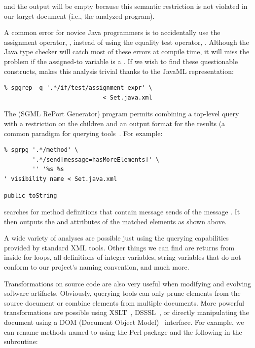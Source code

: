 \documentclass{article}
\begin{document}
\noindent and the output will be empty because this semantic restriction is not
violated in our target document (i.e., the analyzed program).

A common error for novice Java programmers is to accidentally use the
assignment operator, \smtexttt{=}, instead of using the equality test
operator, \smtexttt{==}.  Although the Java type checker will catch
most of these errors at compile time, it will miss the problem if
the assigned-to variable is a . If we wish to find these
questionable constructs,  makes this analysis
trivial thanks to the JavaML representation:

{\small
\begin{verbatim}
% sggrep -q '.*/if/test/assignment-expr' \
                            < Set.java.xml
\end{verbatim}
}

\noindent The  (SGML RePort Generator) program permits combining a
top-level query with a restriction on the children and an output format
for the results (a common paradigm for querying tools~\cite{XMLQL-EnE}.
For example:

{\small
\begin{verbatim}
% sgrpg '.*/method' \
        '.*/send[message=hasMoreElements]' \
        '' '%s %s 
' visibility name < Set.java.xml
\end{verbatim}

\begin{verbatim}
public toString
\end{verbatim}
}

\noindent searches for method definitions that contain message sends of the
message \smtexttt{hasMoreElements}.  It then outputs the
 and  attributes of the matched
elements as shown above.

A wide variety of analyses are possible just using the querying
capabilities provided by standard XML tools.  Other things we can find
are returns from inside for loops, all definitions of integer variables,
string variables that do not conform to our project's naming convention,
and much more.

Transformations on source code are also very useful when modifying and
evolving software artifacts.  Obviously, querying tools can only prune
elements from the source document or combine elements from multiple
documents.  More powerful transformations are possible using
XSLT~\cite{XSLT}, DSSSL~\cite{DSSSL}, or directly manipulating the
document using a DOM (Document Object Model)~\cite{DOM} interface.  For
example, we can rename methods named \smtexttt{isBall} to
 using the Perl package  and the
following in the \smtexttt{start\_tag} subroutine:
\end{document}
